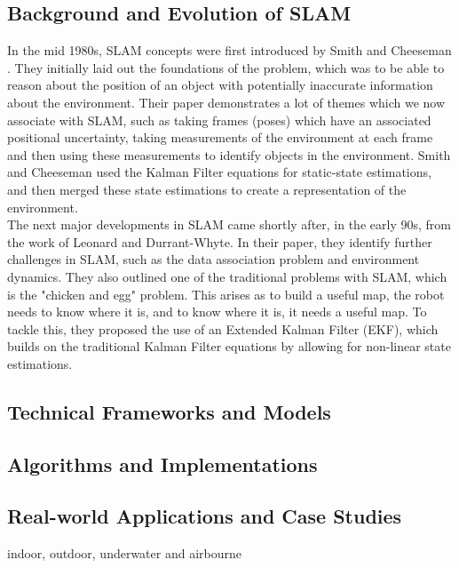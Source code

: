 \documentclass[12pt]{article}
\begin{document}
\subsection{Background and Evolution of SLAM} %
In the mid 1980s, SLAM concepts were first introduced by Smith and Cheeseman \cite{Early_SLAM}. They initially laid out
the foundations of the problem, which was to be able to reason about the position of an object with potentially inaccurate
information about the environment. Their paper demonstrates a lot of themes which we now associate with SLAM, such as taking
frames (poses) which have an associated positional uncertainty, taking measurements of the environment at each frame and
then using these measurements to identify objects in the environment. Smith and Cheeseman used the Kalman Filter equations
for static-state estimations, and then merged these state estimations to create a representation of the environment.\\
The next major developments in SLAM came shortly after, in the early 90s, from the work of Leonard and Durrant-Whyte.
In their paper, they identify further challenges in SLAM, such as the data association problem and environment dynamics.
They also outlined one of the traditional problems with SLAM, which is the "chicken and egg" problem. This arises as
to build a useful map, the robot needs to know where it is, and to know where it is, it needs a useful map. To tackle
this, they proposed the use of an Extended Kalman Filter (EKF), which builds on the traditional Kalman Filter equations by
allowing for non-linear state estimations.

\subsection{Technical Frameworks and Models} %
\subsection{Algorithms and Implementations} %
\subsection{Real-world Applications and Case Studies} %
indoor, outdoor, underwater and airbourne
\end{document}
